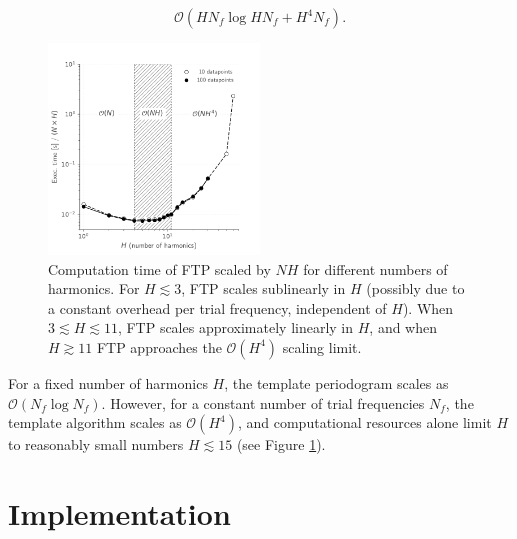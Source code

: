 \documentclass[apj]{emulateapj}
\newcommand{\bigO}{\mathcal{O}}
\begin{document}
\begin{equation}
\bigO(HN_f \log HN_f + H^4N_f).
\end{equation}

\begin{figure}
    \centering
    \includegraphics[width=0.5\textwidth]{plots/timing_vs_nharm.pdf}
    \caption{\label{fig:timingnharm} Computation time of FTP scaled by $NH$ for
            different numbers of harmonics. For $H\lesssim 3$, FTP scales
            sublinearly in $H$ (possibly due to a constant overhead per
            trial frequency, independent of $H$). When $3 \lesssim H \lesssim 11$,
            FTP scales approximately linearly in $H$, and when $H \gtrsim 11$
            FTP approaches the $\bigO(H^4)$ scaling limit.}
\end{figure}

For a fixed number of harmonics $H$, the template periodogram scales as
$\bigO(N_f\log N_f)$. However, for a constant number of trial frequencies $N_f$, 
the template algorithm scales as $\bigO(H^4)$, and computational resources
alone limit $H$ to reasonably small numbers $H\lesssim15$ (see Figure \ref{fig:timingnharm}).


\section{Implementation}\label{sec:implementation}
\end{document}
